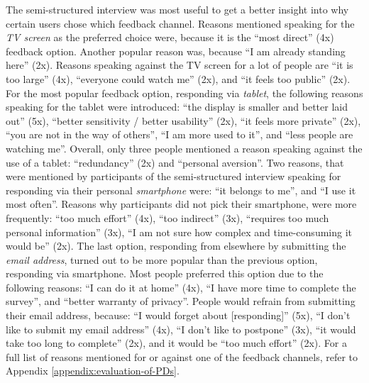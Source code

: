 	The semi-structured interview was most useful to get a better insight into why certain users chose which feedback channel. Reasons mentioned speaking for the \textit{TV screen} as the preferred choice were, because it is the ``most direct'' (4x) feedback option. Another popular reason was, because ``I am already standing here'' (2x). Reasons speaking against the TV screen for a lot of people are ``it is too large'' (4x), ``everyone could watch me'' (2x), and ``it feels too public'' (2x). 
	For the most popular feedback option, responding via \textit{tablet}, the following reasons speaking for the tablet were introduced: ``the display is smaller and better laid out'' (5x), ``better sensitivity / better usability'' (2x), ``it feels more private'' (2x), ``you are not in the way of others'', ``I am more used to it'', and ``less people are watching me''. Overall, only three people mentioned a reason speaking against the use of a tablet: ``redundancy'' (2x) and ``personal aversion''.
	Two reasons, that were mentioned by participants of the semi-structured interview speaking for responding via their personal \textit{smartphone} were: ``it belongs to me'', and ``I use it most often''. Reasons why participants did not pick their smartphone, were more frequently: ``too much effort'' (4x), ``too indirect'' (3x), ``requires too much personal information'' (3x), ``I am not sure how complex and time-consuming it would be'' (2x).
	The last option, responding from elsewhere by submitting the \textit{email address}, turned out to be more popular than the previous option, responding via smartphone. Most people preferred this option due to the following reasons: ``I can do it at home'' (4x), ``I have more time to complete the survey'', and ``better warranty of privacy''. People would refrain from submitting their email address, because: ``I would forget about [responding]'' (5x), ``I don't like to submit my email address'' (4x), ``I don't like to postpone'' (3x), ``it would take too long to complete'' (2x), and it would be ``too much effort'' (2x). 
	For a full list of reasons mentioned for or against one of the feedback channels, refer to Appendix \ref{appendix:evaluation-of-PDs}.


